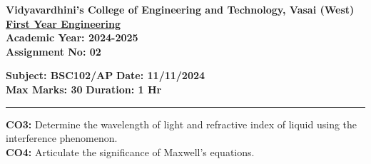 \documentclass[a4paper,12pt]{article}
\begin{document}
	
\begin{center}
\textbf{\Large \textbf{Vidyavardhini's College of Engineering and Technology, Vasai (West)}} \\
\vspace{0.3cm}
\textbf{\large \underline{First Year Engineering}} \\
\vspace{0.3cm}
\textbf{\large Academic Year: 2024-2025} \\
\vspace{0.3cm}
\textbf{\large Assignment No: 02 } \\
\end{center}

\noindent
\textbf{Subject: BSC102/AP} \hfill { \textbf{Date: 11/11/2024} }\\
\textbf{Max Marks: 30} \hfill { \textbf{Duration: 1 Hr} }\\
\hrule

\vspace{0.2cm}
\noindent
\textbf{CO3:} Determine the wavelength of light and refractive index of liquid using the interference phenomenon. \\
\vspace{0.3cm}
\textbf{CO4:} Articulate the significance of Maxwell’s equations.
\end{document}
